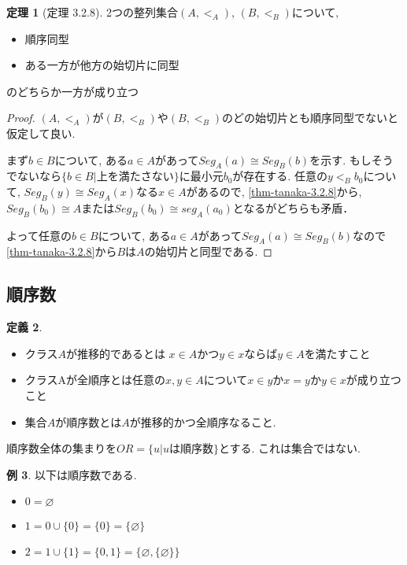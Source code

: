 \documentclass[dvipdfmx,a4paper,11pt]{report}
\theoremstyle{definition}
\newtheorem{thm}{定理}
\newtheorem{dfn}[thm]{定義}
\newtheorem{exa}[thm]{例}
\begin{document}
 \begin{tcolorbox}
 [colback = white, colframe = green!35!black, fonttitle = \bfseries,breakable = true]
\begin{thm}[定理 3.2.8]
2つの整列集合$(A,<_A)$, $(B,<_B)$について, 
\begin{itemize}
\item 順序同型
\item ある一方が他方の始切片に同型
\end{itemize}
のどちらか一方が成り立つ
\end{thm}
\end{tcolorbox}
\begin{proof}
$(A, <_A)$が$(B,<_B)$や$(B, <_B)$のどの始切片とも順序同型でないと仮定して良い.

まず$b \in B$について, ある$a \in A$があって$Seg_A(a) \cong Seg_B(b)$を示す.
 もしそうでないなら$\{ b \in B | \text{上を満たさない}\}$に最小元$b_0$が存在する. 
 任意の$y <_B b_0$について, $Seg_B(y) \cong Seg_A(x)$なる$x \in A$があるので, \ref{thm-tanaka-3.2.8}から, $Seg_{B}(b_0) \cong A$または$Seg_{B}(b_0) \cong seg_{A}(a_0)$となるがどちらも矛盾．
 
 よって任意の$b \in B$について, ある$a \in A$があって$Seg_A(a) \cong Seg_B(b)$なので\ref{thm-tanaka-3.2.8}から$B$は$A$の始切片と同型である.
\end{proof}

\subsection{順序数}

 \begin{tcolorbox}
 [colback = white, colframe = green!35!black, fonttitle = \bfseries,breakable = true]
\begin{dfn}
\begin{itemize}
\item クラス$A$が推移的であるとは
$x \in A$かつ$y \in x$ならば$y \in A$を満たすこと
\item クラスAが全順序とは任意の$x,y \in A$について$x \in y$か$x=y$か$y \in x$が成り立つこと
\item 集合$A$が順序数とは$A$が推移的かつ全順序なること. 
\end{itemize}
\end{dfn}
\end{tcolorbox}
順序数全体の集まりを$OR = \{ u | \text{$u$は順序数} \}$とする. 
これは集合ではない. 

\begin{exa}
以下は順序数である. 
\begin{itemize}
\item $0 = \varnothing$
\item $1 = 0 \cup \{ 0\} = \{ 0\} =\{ \varnothing\}$
\item $2 = 1 \cup \{1\} = \{0,1 \}= \{\varnothing, \{ \varnothing\}\}$
\end{itemize}
\end{exa}
\end{document}
